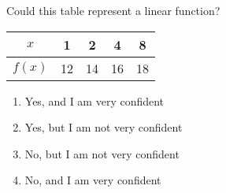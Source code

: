 \bigskip

\item Could this table represent a linear function?

\begin{tabular}{|c|c|c|c|c|}
\hline
$x$ & 1 & 2 & 4 & 8 \\
\hline
$f(x)$ & 12 & 14 & 16 & 18 \\
\hline
\end{tabular}

\begin{enumerate}
\item Yes, and I am very confident  
\item Yes, but I am not very confident
\item No, but I am not very confident
\item No, and I am very confident  
\end{enumerate}

